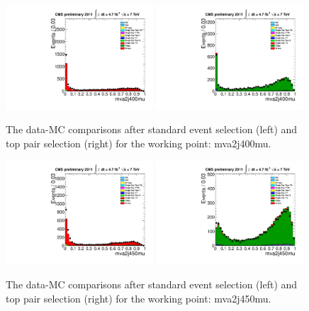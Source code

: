 \begin{figure}[!t]
  \centering
  \includegraphics[width=0.49\textwidth]{figs/cl-mva2j400mu-normal.pdf}
  \includegraphics[width=0.49\textwidth]{figs/cl-mva2j400mu-inTTbar.pdf}
  \caption{\label{fig:mva:plots-mva2j400mu} The data-MC comparisons
    after standard event selection (left) and top pair
    selection (right) for the working point: mva2j400mu.}
\end{figure}

\begin{figure}[!t]
  \centering
  \includegraphics[width=0.49\textwidth]{figs/cl-mva2j450mu-normal.pdf}
  \includegraphics[width=0.49\textwidth]{figs/cl-mva2j450mu-inTTbar.pdf}
  \caption{\label{fig:mva:plots-mva2j450mu} The data-MC comparisons
    after standard event selection (left) and top pair
    selection (right) for the working point: mva2j450mu.}
\end{figure}

